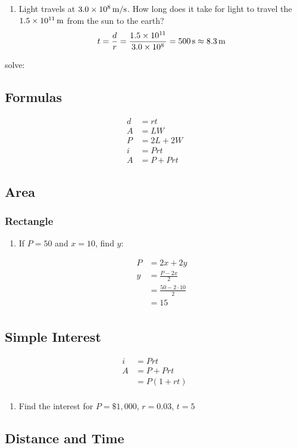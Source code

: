 \documentclass[letterpaper, landscape]{exam}
\begin{document}
\begin{enumerate}

    \item Light travels at $\unit[3.0 \times 10^8]{m/s}$. How long does it take for light to travel
      the $\unit[1.5 \times 10^{11}]{m}$ from the sun to the earth?
      \[
        t = \frac{d}{r} = \frac{1.5 \times 10^{11}}{3.0 \times 10^8} = \unit[500]{s} \approx \unit[8.3]{m}
      \]
  \end{enumerate}
  
  solve:

  \subsection{Formulas} %

  \begin{align*}
    d &= rt \\
    A &= LW \\
    P &= 2L + 2W \\
    i &= Prt \\
    A &= P + Prt
  \end{align*}
  
  \subsection{Area} %
  
  \subsubsection{Rectangle} %


  \begin{enumerate}
    \item If $P = 50$ and $x = 10$, find $y$:

      \begin{align*}
        P & = 2x + 2y \\
        y & = \frac{P - 2x}{2} \\
          & = \frac{50 - 2 \cdot 10}{2} \\
          & = \boxed{ 15 } \\
      \end{align*}
  \end{enumerate}

  \subsection{Simple Interest} %

  \begin{align*}
    i & = Prt \\
    A & = P + Prt \\
      & = P(1 + rt) \\
  \end{align*}

  \begin{enumerate}
    \item Find the interest for $P = \$1,000$, $r = 0.03$, $t = 5$
  \end{enumerate}
  
  \subsection{Distance and Time} %
  
  
  
\end{document}
